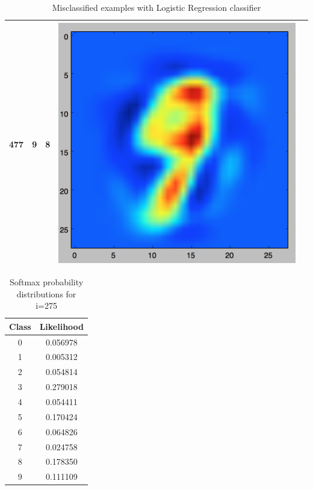 \documentclass[11pt]{article}
\begin{document}
\begin{table}[!th]
\begin{tabular}{|clc|c||c|}
\hline
477 & 9 & 8 & \includegraphics[scale=.2]{images/logit_9_8.png} \\
\hline
\end{tabular}
\caption{Misclassified examples with Logistic Regression classifier}
\label{ex:table}
\end{table}

\begin{table}[!th]
\centering
\begin{tabular}{|c|c|}
\hline
Class & Likelihood \\
\hline
0 & 0.056978 \\
1 & 0.005312 \\
2 & 0.054814 \\
3 & 0.279018 \\
4 & 0.054411 \\
5 & 0.170424 \\
6 & 0.064826 \\
7 & 0.024758 \\
8 & 0.178350 \\
9 & 0.111109 \\
\hline
\end{tabular}
\caption{Softmax probability distributions for i=275}
\label{ex:table}
\end{table}
\end{document}
